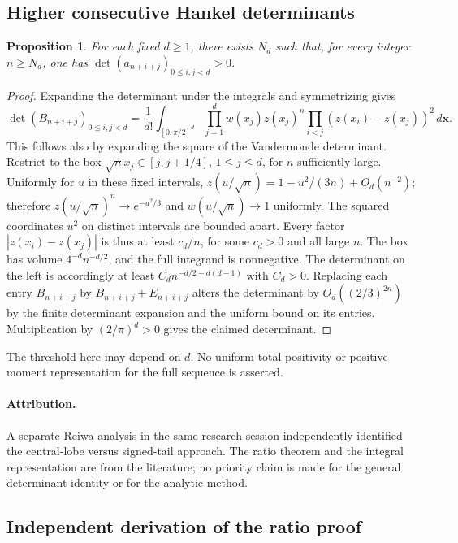 \documentclass[11pt,a4paper]{article}
\newtheorem{SourceRcfKproposition}[SourceRcfKtheorem]{Proposition}
\begin{document}
\subsection{Higher consecutive Hankel determinants}
\begin{SourceRcfKproposition}
For each fixed $d\ge1$, there exists $N_d$ such that, for every
integer $n\ge N_d$, one has
$\det(a_{n+i+j})_{0\le i,j<d}>0$.
\end{SourceRcfKproposition}
\begin{proof}
Expanding the determinant under the integrals and symmetrizing gives
\[
 \det(B_{n+i+j})_{0\le i,j<d}
 =\frac1{d!}\int_{[0,\pi/2]^d}\prod_{j=1}^d w(x_j) z(x_j)^n
     \prod_{i<j}(z(x_i)-z(x_j))^2\,d\mathbf{x}.
\]
This follows also by expanding the square of the Vandermonde determinant.
Restrict to the box $\sqrt n x_j\in [j,j+1/4]$, $1\le j\le d$,
for $n$ sufficiently large. Uniformly for $u$ in these fixed intervals,
$z(u/\sqrt n)=1-u^2/(3n)+O_d(n^{-2})$; therefore
$z(u/\sqrt n)^n\to e^{-u^2/3}$ and $w(u/\sqrt n)\to1$ uniformly.
The squared coordinates $u^2$ on distinct intervals are bounded apart.
Every factor $|z(x_i)-z(x_j)|$ is thus at least $c_d/n$,
for some $c_d>0$ and all large $n$. The box has volume
$4^{-d}n^{-d/2}$, and the full integrand is nonnegative. The determinant
on the left is accordingly at least
$C_d n^{-d/2-d(d-1)}$ with $C_d>0$.
Replacing each entry $B_{n+i+j}$ by $B_{n+i+j}+E_{n+i+j}$
alters the determinant by $O_d((2/3)^{2n})$ by the finite determinant
expansion and the uniform bound on its entries. Multiplication by
$(2/\pi)^d>0$ gives the claimed determinant.
\end{proof}
The threshold here may depend on $d$. No uniform total positivity
or positive moment representation for the full sequence is asserted.
\paragraph{Attribution.}
A separate Reiwa analysis in the same research session independently
identified the central-lobe versus signed-tail approach.
The ratio theorem and the integral representation are from the
literature; no priority claim is made for the general determinant
identity or for the analytic method.
\endgroup


\subsection{Independent derivation of the ratio proof}
\end{document}
